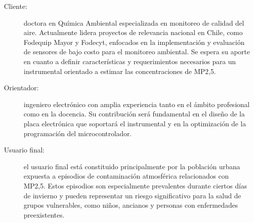 %
%
%
% 
\begin{description}
\item [Cliente:] doctora en Química Ambiental especializada en monitoreo de calidad del aire. Actualmente lidera proyectos de relevancia nacional en Chile, como Fodequip Mayor y Fodecyt, enfocados en la implementación y evaluación de sensores de bajo costo para el monitoreo ambiental. Se espera su aporte en cuanto a definir características y requerimientos necesarios para un instrumental orientado a estimar las concentraciones de MP2,5.
\item [Orientador:] ingeniero electrónico con amplia experiencia tanto en el ámbito profesional como en la docencia. Su contribución será fundamental en el diseño de la placa electrónica que soportará el instrumental y en la optimización de la programación del microcontrolador.

\item [Usuario final:] el usuario final está constituido principalmente por la población urbana expuesta a episodios de contaminación atmosférica relacionados con MP2,5. Estos episodios son especialmente prevalentes durante ciertos días de invierno y pueden representar un riesgo significativo para la salud de grupos vulnerables, como niños, ancianos y personas con enfermedades preexistentes.
\end{description}
%
